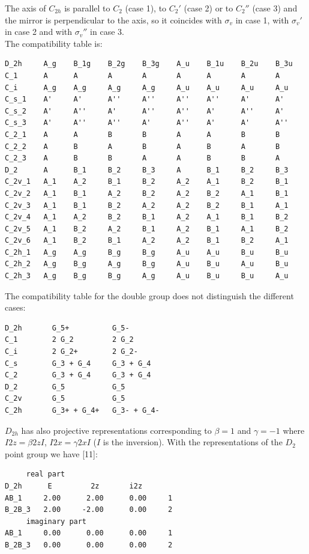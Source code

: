 \documentclass[12pt,a4paper]{article}
\begin{document}
The axis of $C_{2h}$ is parallel to $C_2$ (case 1),
to $C_2'$ (case 2) or to $C_2''$ (case 3) and the mirror is perpendicular
to the axis, so it coincides with $\sigma_v$ in case 1, with $\sigma_v'$ in
case 2 and with $\sigma_v''$ in case 3. \\
The compatibility table is:
\begin{verbatim}
D_2h     A_g    B_1g    B_2g    B_3g    A_u    B_1u    B_2u    B_3u     
C_1      A      A       A       A       A      A       A       A
C_i      A_g    A_g     A_g     A_g     A_u    A_u     A_u     A_u 
C_s_1    A'     A'      A''     A''     A''    A''     A'      A'   
C_s_2    A'     A''     A'      A''     A''    A'      A''     A'   
C_s_3    A'     A''     A''     A'      A''    A'      A'      A''   
C_2_1    A      A       B       B       A      A       B       B
C_2_2    A      B       A       B       A      B       A       B
C_2_3    A      B       B       A       A      B       B       A 
D_2      A      B_1     B_2     B_3     A      B_1     B_2     B_3
C_2v_1   A_1    A_2     B_1     B_2     A_2    A_1     B_2     B_1   
C_2v_2   A_1    B_1     A_2     B_2     A_2    B_2     A_1     B_1   
C_2v_3   A_1    B_1     B_2     A_2     A_2    B_2     B_1     A_1   
C_2v_4   A_1    A_2     B_2     B_1     A_2    A_1     B_1     B_2
C_2v_5   A_1    B_2     A_2     B_1     A_2    B_1     A_1     B_2
C_2v_6   A_1    B_2     B_1     A_2     A_2    B_1     B_2     A_1
C_2h_1   A_g    A_g     B_g     B_g     A_u    A_u     B_u     B_u   
C_2h_2   A_g    B_g     A_g     B_g     A_u    B_u     A_u     B_u   
C_2h_3   A_g    B_g     B_g     A_g     A_u    B_u     B_u     A_u   
\end{verbatim}
The compatibility table for the double group does not distinguish the
different cases: 
\begin{verbatim}
D_2h       G_5+          G_5-
C_1        2 G_2         2 G_2
C_i        2 G_2+        2 G_2-
C_s        G_3 + G_4     G_3 + G_4
C_2        G_3 + G_4     G_3 + G_4
D_2        G_5           G_5
C_2v       G_5           G_5
C_2h       G_3+ + G_4+   G_3- + G_4-
\end{verbatim}
$D_{2h}$ has also projective representations corresponding to
$\beta=1$ and $\gamma=-1$ where $I 2z = \beta 2z I$, 
$I 2x = \gamma 2x I$ ($I$ is the inversion). With the representations
of the $D_2$ point group we have [11]:
\begin{verbatim}
     real part
D_2h      E         2z       i2z
AB_1     2.00      2.00      0.00     1
B_2B_3   2.00     -2.00      0.00     2
     imaginary part
AB_1     0.00      0.00      0.00     1
B_2B_3   0.00      0.00      0.00     2
\end{verbatim}
\end{document}
